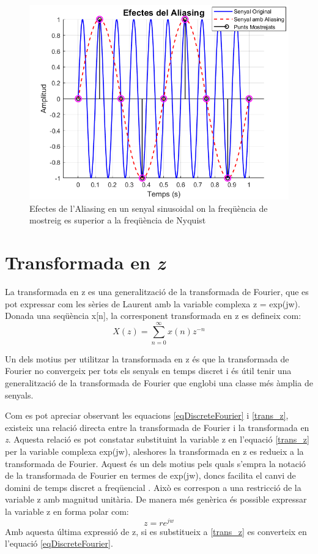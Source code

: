 \begin{figure}[H]
    \centering
    \includegraphics[width=0.5\linewidth]{Images/imatge_aliasing.png}
    \caption{Efectes de l'Aliasing en un senyal sinusoidal on la freqüència de mostreig es superior a la freqüència de Nyquist}
    \label{Aliasing_fig}
\end{figure}

\section{Transformada en \textit{z}}
\par La transformada en z es una generalització de la transformada de Fourier, que es pot expressar com les sèries de Laurent amb la variable complexa z = exp(jw). Donada una seqüència x[n], la corresponent transformada en z es defineix com\cite{ImmAudioSign}:
\begin{equation}\label{trans_z}
    X(z) =  \sum_{n=0}^\infty x(n)z^{-n}
\end{equation}
\par Un dels motius per utilitzar la transformada en z és que la transformada de Fourier no convergeix per tots els senyals en temps discret i és útil tenir una generalització de la transformada de Fourier que englobi una classe més àmplia de senyals.
\par Com es pot apreciar observant les equacions \ref{eqDiscreteFourier} i \ref{trans_z}, existeix una relació directa entre la transformada de Fourier i la transformada en \textit{z}. Aquesta relació es pot constatar substituint la variable z en l'equació \ref{trans_z} per la variable complexa exp(jw), aleshores la transformada en z es redueix a la transformada de Fourier. Aquest és un dels motius pels quals s'empra la notació de la transformada de Fourier en termes de exp(jw), doncs facilita el canvi de domini de temps discret a freqüencial \cite{DiscreteTimeSP}. Això es correspon a una restricció de la variable z amb magnitud unitària. De manera més genèrica és possible expressar la variable z en forma polar com: \[z = re^{jw}\] Amb aquesta última expressió de z, si es substitueix a \ref{trans_z} es converteix en l'equació \ref{eqDiscreteFourier}.

